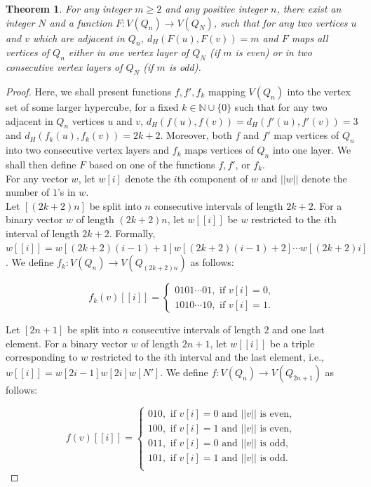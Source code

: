 \documentclass[11pt, a4paper]{article}
\newtheorem{theorem}{Theorem}
\begin{document}
\begin{theorem}
For any integer $m\geq 2$ and any positive integer $n$, there exist an integer $N$ and  a function $F: V(Q_n) \rightarrow V(Q_N)$, such that 
for any two vertices $u$ and $v$ which are adjacent in $Q_n$,  $d_H(F(u), F(v))=m$ and $F$ maps all vertices of $Q_n$ either in one vertex layer of $Q_N$ (if $m$ is even) or 
in two consecutive vertex layers of $Q_N$ (if $m$ is odd).
\end{theorem}
\begin{proof}

Here, we shall present functions $f, f', f_k$ mapping $V(Q_n)$ into the vertex set of some larger hypercube, for a fixed $k\in\mathbb{N}\cup \{0\}$  such that 
for any two adjacent in $Q_n$ vertices $u$ and $v$,  $d_H(f(u), f(v))= d_H(f'(u), f'(v))=3$ and $d_H(f_k(u), f_k(v))=2k+2$. 
Moreover, both $f$ and $f'$ map vertices of $Q_n$ into two consecutive vertex layers  and $f_k$ maps vertices of $Q_n$ into one layer. We shall then define $F$ based on one of the functions $f, f'$, or $f_k$.\\

For any vector $w$, let  $w[i]$ denote the $i$th component of $w$ and $||w||$ denote the number of $1$'s in $w$. \\


Let $[(2k+2)n]$ be split into $n$ consecutive intervals of length $2k+2$.   For a binary vector $w$ of length $(2k+2)n$, let $w[[i]]$ be $w$ restricted to the $i$th interval of length $2k+2$. Formally, $w[[i]] = w[(2k+2)(i-1)+1] w[(2k+2)(i-1)+2] \cdots w[(2k+2)i]$. We define $f_k: V(Q_n) \rightarrow V(Q_{(2k+2)n})$ as follows:

\begin{equation} \nonumber
f_k(v)[[i]] = \begin{cases}
0101\cdots 01,  \mbox{ if }  v[i]=0, \\
1010\cdots 10,  \mbox{ if }  v[i]=1.
\end{cases}
\end{equation}



\vskip 1cm


Let $[2n+1]$ be split into $n$ consecutive intervals of length $2$ and one last element. For a binary vector $w$ of length $2n+1$, let $w[[i]]$ be a triple corresponding to $w$ restricted to the $i$th interval and the last element, i.e., $w[[i]]= w[2i-1] w[2i] w[N']$.   We define $f: V(Q_n)\rightarrow V(Q_{2n+1})$ as follows:

\begin{equation}\nonumber
f(v)[[i]] = \begin{cases}
010,  \mbox{ if }  v[i]=0  \mbox{ and  }  ||v|| \mbox{ is even, }  \\
100,  \mbox{ if }  v[i]=1  \mbox{ and  }  ||v|| \mbox{ is even, }  \\
011,  \mbox{ if }  v[i]=0  \mbox{ and  }  ||v|| \mbox{ is odd, }  \\
101,  \mbox{ if }  v[i]=1  \mbox{ and  }  ||v|| \mbox{ is odd. }  \\
\end{cases}
\end{equation}


\end{proof}
\end{document}
